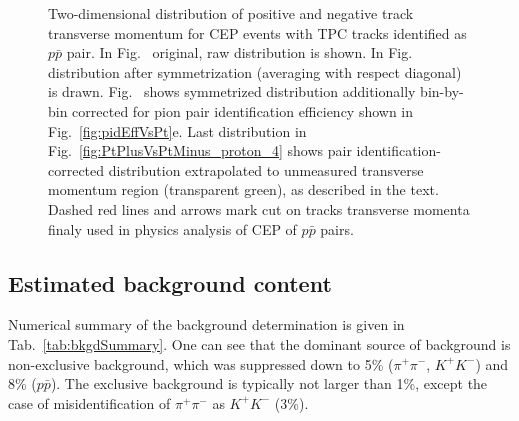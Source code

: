 \begin{figure}[h]
\caption[Two-dimensional distribution of positive and negative track transverse momentum for CEP $p\bar{p}$ events.]{Two-dimensional distribution of positive and negative track transverse momentum for CEP events with TPC tracks identified as $p\bar{p}$ pair. In Fig.~ original, raw distribution is shown. In Fig.~ distribution after symmetrization (averaging with respect diagonal) is drawn. Fig.~ shows symmetrized distribution additionally bin-by-bin corrected for pion pair identification efficiency shown in Fig.~\ref{fig:pidEffVsPt}e. Last distribution in Fig.~\ref{fig:PtPlusVsPtMinus_proton_4} shows pair identification-corrected distribution extrapolated to unmeasured transverse momentum region (transparent green), as described in the text. Dashed red lines and arrows mark cut on tracks transverse momenta finaly used in physics analysis of CEP of $p\bar{p}$ pairs.}\label{fig:PtPlusVsPtMinus_proton}
\end{figure}



\subsection{Estimated background content}\label{sec:bkgdSummary}


Numerical summary of the background determination is given in Tab.~\ref{tab:bkgdSummary}. One can see that the dominant source of background is non-exclusive background, which was suppressed down to 5\% ($\pi^{+}\pi^{-}$, $K^{+}K^{-}$) and 8\% ($p\bar{p}$). The exclusive background is typically not larger than 1\%, except the case of misidentification of $\pi^{+}\pi^{-}$ as $K^{+}K^{-}$ (3\%).

